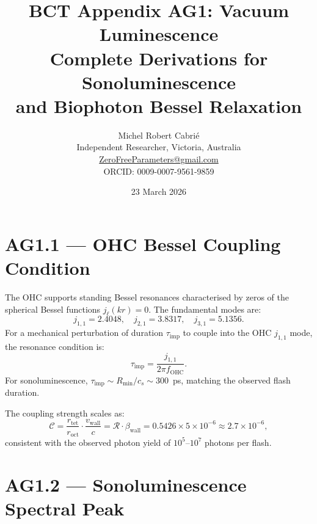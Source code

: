 \documentclass[10pt,twocolumn]{article}
\title{\textbf{\color{bctnavy}BCT Appendix AG1: Vacuum Luminescence}\\
{\large\color{bctblue}Complete Derivations for Sonoluminescence\\
and Biophoton Bessel Relaxation}}
\author{Michel Robert Cabri\'{e}\\
{\small Independent Researcher, Victoria, Australia}\\
{\small \href{mailto:ZeroFreeParameters@gmail.com}{ZeroFreeParameters@gmail.com}}\\
{\small ORCID: 0009-0007-9561-9859}}
\date{23 March 2026}
\begin{document}
\sloppy
{}

\section{AG1.1 --- OHC Bessel Coupling Condition}

The OHC supports standing Bessel resonances characterised by zeros
of the spherical Bessel functions $j_\ell(kr)=0$. The fundamental
modes are:
\begin{equation}
j_{1,1}=2.4048,\quad j_{2,1}=3.8317,\quad j_{3,1}=5.1356.
\end{equation}
For a mechanical perturbation of duration $\tau_\mathrm{imp}$ to
couple into the OHC $j_{1,1}$ mode, the resonance condition is:
\begin{equation}
\tau_\mathrm{imp}=\frac{j_{1,1}}{2\pi f_\mathrm{OHC}}.
\end{equation}
For sonoluminescence, $\tau_\mathrm{imp}\sim R_\mathrm{min}/c_s
\sim 300$~ps, matching the observed flash duration.

The coupling strength scales as:
\begin{equation}
\mathcal{C}=\frac{r_\mathrm{tet}}{r_\mathrm{oct}}\cdot
\frac{v_\mathrm{wall}}{c}=\mathcal{R}\cdot\beta_\mathrm{wall}
=0.5426\times 5\times10^{-6}\approx2.7\times10^{-6},
\end{equation}
consistent with the observed photon yield of $10^5$--$10^7$
photons per flash.

\section{AG1.2 --- Sonoluminescence Spectral Peak}
\end{document}

